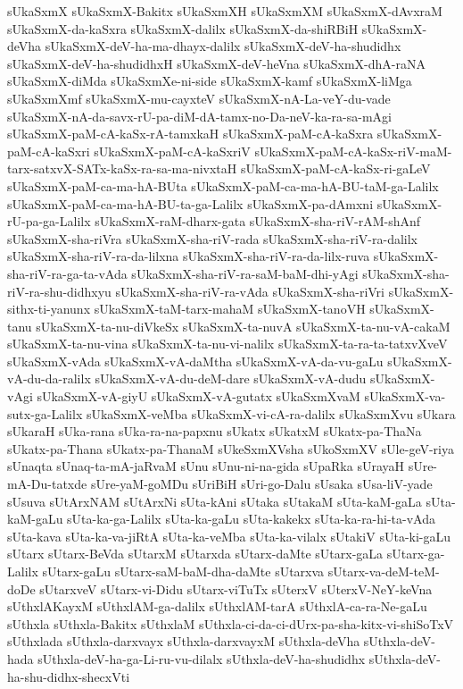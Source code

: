 {sUkaSxmX
sUkaSxmX-Bakitx
sUkaSxmXH
sUkaSxmXM
sUkaSxmX-dAvxraM
sUkaSxmX-da-kaSxra
sUkaSxmX-dalilx
sUkaSxmX-da-shiRBiH
sUkaSxmX-deVha
sUkaSxmX-deV-ha-ma-dhayx-dalilx
sUkaSxmX-deV-ha-shudidhx
sUkaSxmX-deV-ha-shudidhxH
sUkaSxmX-deV-heVna
sUkaSxmX-dhA-raNA
sUkaSxmX-diMda
sUkaSxmXe-ni-side
sUkaSxmX-kamf
sUkaSxmX-liMga
sUkaSxmXmf
sUkaSxmX-mu-cayxteV
sUkaSxmX-nA-La-veY-du-vade
sUkaSxmX-nA-da-savx-rU-pa-diM-dA-tamx-no-Da-neV-ka-ra-sa-mAgi
sUkaSxmX-paM-cA-kaSx-rA-tamxkaH
sUkaSxmX-paM-cA-kaSxra
sUkaSxmX-paM-cA-kaSxri
sUkaSxmX-paM-cA-kaSxriV
sUkaSxmX-paM-cA-kaSx-riV-maM-tarx-satxvX-SATx-kaSx-ra-sa-ma-nivxtaH
sUkaSxmX-paM-cA-kaSx-ri-gaLeV
sUkaSxmX-paM-ca-ma-hA-BUta
sUkaSxmX-paM-ca-ma-hA-BU-taM-ga-Lalilx
sUkaSxmX-paM-ca-ma-hA-BU-ta-ga-Lalilx
sUkaSxmX-pa-dAmxni
sUkaSxmX-rU-pa-ga-Lalilx
sUkaSxmX-raM-dharx-gata
sUkaSxmX-sha-riV-rAM-shAnf
sUkaSxmX-sha-riVra
sUkaSxmX-sha-riV-rada
sUkaSxmX-sha-riV-ra-dalilx
sUkaSxmX-sha-riV-ra-da-lilxna
sUkaSxmX-sha-riV-ra-da-lilx-ruva
sUkaSxmX-sha-riV-ra-ga-ta-vAda
sUkaSxmX-sha-riV-ra-saM-baM-dhi-yAgi
sUkaSxmX-sha-riV-ra-shu-didhxyu
sUkaSxmX-sha-riV-ra-vAda
sUkaSxmX-sha-riVri
sUkaSxmX-sithx-ti-yanunx
sUkaSxmX-taM-tarx-mahaM
sUkaSxmX-tanoVH
sUkaSxmX-tanu
sUkaSxmX-ta-nu-diVkeSx
sUkaSxmX-ta-nuvA
sUkaSxmX-ta-nu-vA-cakaM
sUkaSxmX-ta-nu-vina
sUkaSxmX-ta-nu-vi-nalilx
sUkaSxmX-ta-ra-ta-tatxvXveV
sUkaSxmX-vAda
sUkaSxmX-vA-daMtha
sUkaSxmX-vA-da-vu-gaLu
sUkaSxmX-vA-du-da-ralilx
sUkaSxmX-vA-du-deM-dare
sUkaSxmX-vA-dudu
sUkaSxmX-vAgi
sUkaSxmX-vA-giyU
sUkaSxmX-vA-gutatx
sUkaSxmXvaM
sUkaSxmX-va-sutx-ga-Lalilx
sUkaSxmX-veMba
sUkaSxmX-vi-cA-ra-dalilx
sUkaSxmXvu
sUkara
sUkaraH
sUka-rana
sUka-ra-na-papxnu
sUkatx
sUkatxM
sUkatx-pa-ThaNa
sUkatx-pa-Thana
sUkatx-pa-ThanaM
sUkeSxmXVsha
sUkoSxmXV
sUle-geV-riya
sUnaqta
sUnaq-ta-mA-jaRvaM
sUnu
sUnu-ni-na-gida
sUpaRka
sUrayaH
sUre-mA-Du-tatxde
sUre-yaM-goMDu
sUriBiH
sUri-go-Dalu
sUsaka
sUsa-liV-yade
sUsuva
sUtArxNAM
sUtArxNi
sUta-kAni
sUtaka
sUtakaM
sUta-kaM-gaLa
sUta-kaM-gaLu
sUta-ka-ga-Lalilx
sUta-ka-gaLu
sUta-kakekx
sUta-ka-ra-hi-ta-vAda
sUta-kava
sUta-ka-va-jiRtA
sUta-ka-veMba
sUta-ka-vilalx
sUtakiV
sUta-ki-gaLu
sUtarx
sUtarx-BeVda
sUtarxM
sUtarxda
sUtarx-daMte
sUtarx-gaLa
sUtarx-ga-Lalilx
sUtarx-gaLu
sUtarx-saM-baM-dha-daMte
sUtarxva
sUtarx-va-deM-teM-doDe
sUtarxveV
sUtarx-vi-Didu
sUtarx-viTuTx
sUterxV
sUterxV-NeY-keVna
sUthxlAKayxM
sUthxlAM-ga-dalilx
sUthxlAM-tarA
sUthxlA-ca-ra-Ne-gaLu
sUthxla
sUthxla-Bakitx
sUthxlaM
sUthxla-ci-da-ci-dUrx-pa-sha-kitx-vi-shiSoTxV
sUthxlada
sUthxla-darxvayx
sUthxla-darxvayxM
sUthxla-deVha
sUthxla-deV-hada
sUthxla-deV-ha-ga-Li-ru-vu-dilalx
sUthxla-deV-ha-shudidhx
sUthxla-deV-ha-shu-didhx-shecxVti
}
